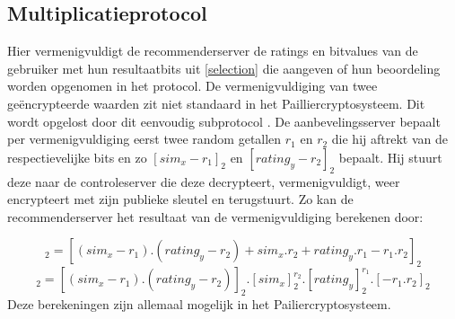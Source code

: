 \subsection{Multiplicatieprotocol}
\label{multiplication} 
Hier vermenigvuldigt de recommenderserver de ratings en bitvalues van de gebruiker met hun resultaatbits uit \ref{selection} die aangeven of hun beoordeling worden opgenomen in het protocol. De vermenigvuldiging van twee ge\"encrypteerde waarden zit niet standaard in het Pailliercryptosysteem. Dit wordt opgelost door dit eenvoudig subprotocol \cite{erkin:generating}. De aanbevelingsserver bepaalt per vermenigvuldiging eerst twee random getallen $r_1$ en $r_2$ die hij aftrekt van de respectievelijke bits en zo $[sim_x - r_1]_2$ en $[rating_y - r_2]_2$ bepaalt. Hij stuurt deze naar de controleserver die deze decrypteert, vermenigvuldigt, weer encrypteert met zijn publieke sleutel en terugstuurt. Zo kan de recommenderserver het resultaat van de vermenigvuldiging berekenen door:

\begin{equation}
[sim_x.rating_y]_2=[(sim_x-r_1).(rating_y-r_2) + sim_x.r_2 + rating_y.r_1 - r_1.r_2]_2
\end{equation}
\begin{equation}
[sim_x.rating_y]_2= [(sim_x-r_1).(rating_y-r_2)]_2 . [sim_x]_2^{r_2} . [rating_y]_2^{r_1}.[-r_1.r_2]_2
\end{equation}
Deze berekeningen zijn allemaal mogelijk in het Pailiercryptosysteem.